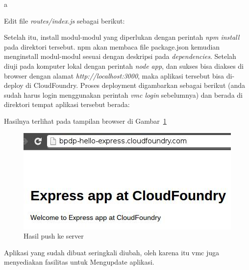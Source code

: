 \lstset{language=Javascript,caption=app.js untuk ExpressJS}a


Edit file \textit{routes/index.js} sebagai berikut:

\lstset{language=Javascript,caption=Hasil edit routes/index.js}


Setelah itu, install modul-modul yang diperlukan dengan perintah \textit{npm install} pada direktori tersebut. npm akan membaca file package.json kemudian menginstall modul-modul sesuai dengan deskripsi pada \textit{dependencies}. Setelah diuji pada komputer lokal dengan perintah \textit{node app}, dan sukses bisa diakses di browser dengan alamat \textit{http://localhost:3000}, maka aplikasi tersebut bisa di-deploy di CloudFoundry. Proses deployment digambarkan sebagai berikut (anda sudah harus login menggunakan perintah \textit{vmc login} sebelumnya) dan berada di direktori tempat aplikasi tersebut berada:

\lstset{language=bash,caption=Deployment aplikasi ExpressJS ke CF}


Hasilnya terlihat pada tampilan browser di Gambar~\ref{fig:modul1-hello}

  \begin{figure}
    \begin{center}
      \includegraphics[scale=0.5]{images/bpdp-hello-express.jpg}
    \end{center}
    \caption{Hasil push ke server}
    \label{fig:modul1-hello}
  \end{figure}

Aplikasi yang sudah dibuat seringkali diubah, oleh karena itu vmc juga menyediakan fasilitas untuk Mengupdate aplikasi. 

\lstset{language=Javascript,caption=Update: menambahkan versi Node.js ke routes/index.js}


